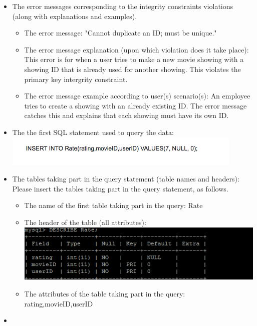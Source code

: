 {\begin{itemize}
\begin{itemize}
	  \item{The attributes of the table taking part in the query: }
	 showID,sTime,sDate,price,movieID,theaterID
	 \end{itemize}
	 Please repeat that pattern for all tables taking part in that query.
\item{}
	The error messages corresponding to the integrity constraints violations (along with explanations and examples).
	\begin{itemize} 
	\item{The error message: }
	"Cannot duplicate an ID; must be unique."
	\item{The error message explanation (upon which violation does it take place): }
	This error is for when a user tries to make a new movie showing with a showing ID that is already used for another showing.  This violates the primary key intergrity constraint.
	\item{The error message example according to user(s) scenario(s): }
	An employee tries to create a showing with an already existing ID.  The error message catches this and explains that each showing must have its own ID.
	 \end{itemize}
\item{The the first SQL statement used to query the data: }
	\includegraphics[scale=0.3]{sql.png}
\item{The tables taking part in the query statement (table names and headers): }
	Please insert the tables taking part in the query statement, as follows.
	 \begin{itemize} 
	 \item{The name of the first table taking part in the query: }
	 Rate
	 \item{The header of the table  (all attributes): }
	\includegraphics[scale=0.3]{mm.png}
	 \item{The attributes of the table taking part in the query: }
	  rating,movieID,userID
	 \end{itemize}
\item{}

\end{itemize}}
